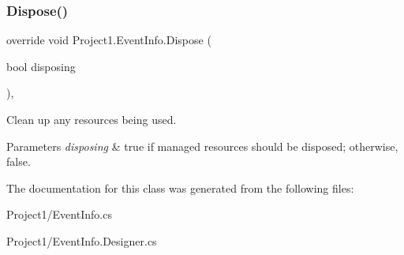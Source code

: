 \subsubsection{\texorpdfstring{Dispose()}{Dispose()}}
{\footnotesize\ttfamily override void Project1.\+Event\+Info.\+Dispose (\begin{DoxyParamCaption}\item[{bool}]{disposing }\end{DoxyParamCaption})\hspace{0.3cm}{\ttfamily [inline]}, {\ttfamily [protected]}}



Clean up any resources being used. 


\begin{DoxyParams}{Parameters}
{\em disposing} & true if managed resources should be disposed; otherwise, false.\\
\hline
\end{DoxyParams}


The documentation for this class was generated from the following files\+:\begin{DoxyCompactItemize}
\item 
Project1/Event\+Info.\+cs\item 
Project1/Event\+Info.\+Designer.\+cs\end{DoxyCompactItemize}
